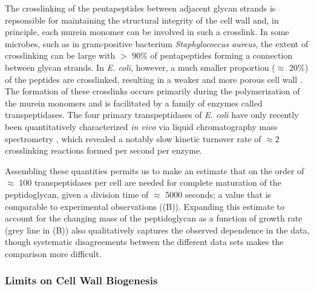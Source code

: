 



The crosslinking of the pentapeptides between adjacent glycan strands is
repsonsible for maintaining the structural integrity of the cell wall and, in
principle, each murein monomer can be involved in such a crosslink. In some
microbes, such as in gram-positive bacterium \textit{Staphylococcus aureus},
the extent of crosslinking can be large with $>$ 90\% of pentapeptides
forming a connection between glycan strands. In \textit{E. coli}, however, a
much smaller proportion ($\approx$ 20\%) of the peptides are crosslinked,
resulting in a weaker and more porous cell wall \cite{vollmer2008a,
rogers1980}. The formation of these crosslinks occurs primarily during the
polymerization of the murein monomers and is facilitated by a family of
enzymes called transpeptidases. The four primary transpeptidases of
\textit{E. coli} have only recently been quantitatively characterized
\textit{in vivo} via liquid chromatography mass spectrometry
\citep{catherwood2020}, which revealed a notably slow kinetic turnover rate
of $\approx 2$ crosslinking reactions formed per second per enzyme.

Assembling these quantities permits us to make an estimate that on the order of
$\approx$ 100 transpeptidases per cell are needed for complete maturation of the
peptidoglycan, given a division time of $\approx$ 5000 seconds; a value that is
comparable to experimental observations ((B)). Expanding this
estimate to account for the changing mass of the peptidoglycan as a function
of growth rate (grey line in (B)) also qualitatively captures
the observed dependence in the data, though systematic disagreements between the
different data sets makes the comparison more difficult.

\subsubsection{Limits on Cell Wall Biogenesis}


